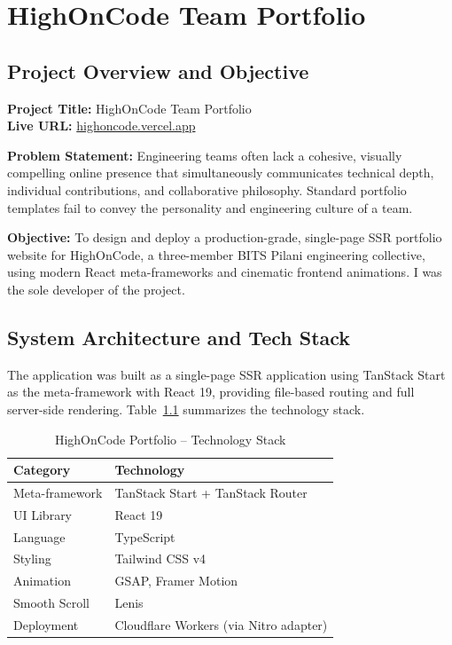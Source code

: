 \documentclass{book}
\begin{document}
\chapter{HighOnCode Team Portfolio}

\section{Project Overview and Objective}

\par\noindent \textbf{Project Title:} HighOnCode Team Portfolio\\
\textbf{Live URL:} \href{https://highoncode.vercel.app}{highoncode.vercel.app}

\par\noindent \textbf{Problem Statement:} Engineering teams often lack a cohesive, visually compelling online presence that simultaneously communicates technical depth, individual contributions, and collaborative philosophy. Standard portfolio templates fail to convey the personality and engineering culture of a team.

\par\noindent \textbf{Objective:} To design and deploy a production-grade, single-page SSR portfolio website for HighOnCode, a three-member BITS Pilani engineering collective, using modern React meta-frameworks and cinematic frontend animations. I was the sole developer of the project.

\section{System Architecture and Tech Stack}

\par\noindent The application was built as a single-page SSR application using TanStack Start as the meta-framework with React 19, providing file-based routing and full server-side rendering. Table~\ref{tab:hoc_stack} summarizes the technology stack.

\begin{table}[!h]
\begin{center}
\small
\begin{tabular}{|l|l|}
\hline
\textbf{Category} & \textbf{Technology} \\
\hline
Meta-framework & TanStack Start + TanStack Router \\
UI Library & React 19 \\
Language & TypeScript \\
Styling & Tailwind CSS v4 \\
Animation & GSAP, Framer Motion \\
Smooth Scroll & Lenis \\
Deployment & Cloudflare Workers (via Nitro adapter) \\
\hline
\end{tabular}
\caption{HighOnCode Portfolio -- Technology Stack}
\label{tab:hoc_stack}
\end{center}
\end{table}
\end{document}
